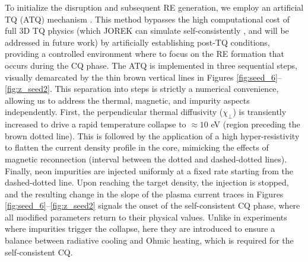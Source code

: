 \documentclass[aip,reprint]{revtex4-1}
\begin{document}
To initialize the disruption and subsequent RE generation, we employ an artificial TQ (ATQ) mechanism \cite{Emanuelli2025, Bandaru2024b, Vannini2025, Schwarz2023, Schwarz2023b}. This method bypasses the high computational cost of full 3D TQ physics (which JOREK can simulate self-consistently \cite{Hu2023, Hu2023b, Bonfiglio2025, Nardon2021}, and will be addressed in future work) by artificially establishing post-TQ conditions, providing a controlled environment where to focus on the RE formation that occurs during the CQ phase.
The ATQ is implemented in three sequential steps, visually demarcated by the thin brown vertical lines in Figures \ref{fig:seed_6}--\ref{fig:z_seed2}. This separation into steps is strictly a numerical convenience, allowing us to address the thermal, magnetic, and impurity aspects independently. First, the perpendicular thermal diffusivity ($\chi_\perp$) is transiently increased to drive a rapid temperature collapse to $\approx 10$ eV (region preceding the brown dotted line). This is followed by the application of a high hyper-resistivity to flatten the current density profile in the core, mimicking the effects of magnetic reconnection \cite{Yamada2010} (interval between the dotted and dashed-dotted lines). Finally, neon impurities are injected uniformly at a fixed rate starting from the dashed-dotted line. Upon reaching the target density, the injection is stopped, and the resulting change in the slope of the plasma current traces in Figures \ref{fig:seed_6}--\ref{fig:z_seed2} signals the onset of the self-consistent CQ phase, where all modified parameters return to their physical values. Unlike in experiments where impurities trigger the collapse, here they are introduced to ensure a balance between radiative cooling and Ohmic heating, which is required for the self-consistent CQ.
\end{document}
